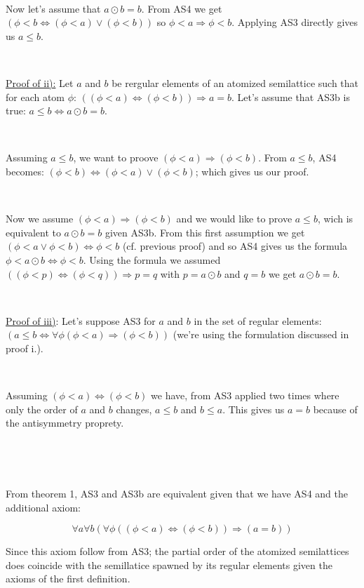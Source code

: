 \documentclass[a4paper, 11pt]{article}
\begin{document}
\

Now let's assume that $a \odot b = b$. From AS4 we get $(\phi < b \Leftrightarrow (\phi < a) \lor (\phi < b))$ so $\phi < a \Rightarrow \phi < b$. Applying AS3 directly gives us $a \leq b$.

\

\noindent
\underline{Proof of ii):} Let $a$ and $b$ be rergular elements of an atomized semilattice such that for each atom $\phi$: $((\phi < a) \Leftrightarrow (\phi <  b)) \Rightarrow a = b$. Let's assume that AS3b is true: $a \leq b \Leftrightarrow a \odot b = b$.

\

Assuming $a \leq b$, we want to proove $(\phi < a) \Rightarrow (\phi < b)$. From $a \leq b$, AS4 becomes: $(\phi < b) \Leftrightarrow (\phi < a) \lor (\phi < b)$; which gives us our proof.

\

Now we assume $(\phi < a) \Rightarrow (\phi < b)$ and we would like to prove $a \leq b$, wich is equivalent to $a \odot b = b$ given AS3b. From this first assumption we get $(\phi < a \lor \phi < b) \Leftrightarrow \phi < b$ (cf. previous proof) and so AS4 gives us the formula $\phi < a \odot b \Leftrightarrow \phi < b$. Using the formula we assumed $((\phi < p) \Leftrightarrow (\phi < q)) \Rightarrow p = q$ with $p = a \odot b$ and $q = b$ we get $a \odot b = b$.

\

\noindent
\underline{Proof of iii)}: Let's suppose AS3 for $a$ and $b$ in the set of regular elements: \\
$(a \leq b \Leftrightarrow \forall \phi (\phi < a) \Rightarrow (\phi < b))$ (we're using the formulation discussed in proof i.).

\

Assuming $(\phi < a) \Leftrightarrow (\phi < b)$ we have, from AS3 applied two times where only the order of $a$ and $b$ changes, $a \leq b$ and $b \leq a$. This gives us $a=b$ because of the antisymmetry proprety.

\

\

From theorem 1, AS3 and AS3b are equivalent given that we have AS4 and the additional axiom:

$$\forall a \forall b (\forall \phi (( \phi < a ) \Leftrightarrow (\phi < b)) \Rightarrow (a = b))$$

Since this axiom follow from AS3; the partial order of the atomized semilattices does coincide with the semillatice spawned by its regular elements given the axioms of the first definition.
\end{document}
